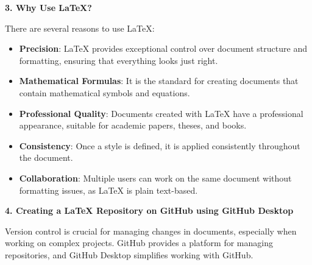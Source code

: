 \documentclass[a4paper,12pt]{article}
\begin{document}
\begin{center}
\textbf{3. Why Use \LaTeX?}\\
\end{center}
There are several reasons to use \LaTeX{}:\\
\begin{itemize}
    \item \textbf{Precision}: \LaTeX{} provides exceptional control over document structure and formatting, ensuring that everything looks just right.
    \item \textbf{Mathematical Formulas}: It is the standard for creating documents that contain mathematical symbols and equations.
    \item \textbf{Professional Quality}: Documents created with \LaTeX{} have a professional appearance, suitable for academic papers, theses, and books.
    \item \textbf{Consistency}: Once a style is defined, it is applied consistently throughout the document.
    \item \textbf{Collaboration}: Multiple users can work on the same document without formatting issues, as \LaTeX{} is plain text-based.
\end{itemize}

\begin{center}
\textbf{4. Creating a \LaTeX{} Repository on GitHub using GitHub Desktop}
\end{center}
Version control is crucial for managing changes in documents, especially when working on complex projects. GitHub provides a platform for managing repositories, and GitHub Desktop simplifies working with GitHub.
\end{document}
